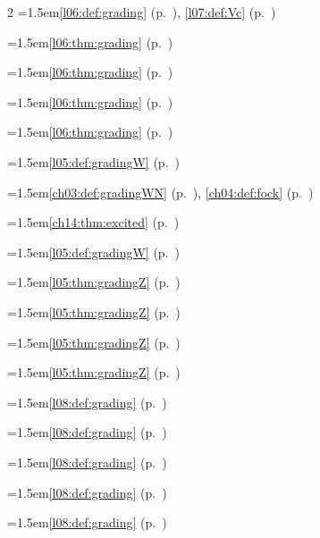 \begin{multicols}{2}
\hangindent=1.5em\quad \ref{l06:def:grading} (p.~\pageref{l06:def:grading}), \ref{l07:def:Vc} (p.~\pageref{l07:def:Vc})\par
\hangindent=1.5em\quad \ref{l06:thm:grading} (p.~\pageref{l06:thm:grading})\par
\hangindent=1.5em\quad \ref{l06:thm:grading} (p.~\pageref{l06:thm:grading})\par
\hangindent=1.5em\quad \ref{l06:thm:grading} (p.~\pageref{l06:thm:grading})\par
\hangindent=1.5em\quad \ref{l06:thm:grading} (p.~\pageref{l06:thm:grading})\par
\hangindent=1.5em\quad \ref{l05:def:gradingW} (p.~\pageref{l05:def:gradingW})\par
\hangindent=1.5em\quad \ref{ch03:def:gradingWN} (p.~\pageref{ch03:def:gradingWN}), \ref{ch04:def:fock} (p.~\pageref{ch04:def:fock})\par
\hangindent=1.5em\quad \ref{ch14:thm:excited} (p.~\pageref{ch14:thm:excited})\par
\hangindent=1.5em\quad \ref{l05:def:gradingW} (p.~\pageref{l05:def:gradingW})\par
\hangindent=1.5em\quad \ref{l05:thm:gradingZ} (p.~\pageref{l05:thm:gradingZ})\par
\hangindent=1.5em\quad \ref{l05:thm:gradingZ} (p.~\pageref{l05:thm:gradingZ})\par
\hangindent=1.5em\quad \ref{l05:thm:gradingZ} (p.~\pageref{l05:thm:gradingZ})\par
\hangindent=1.5em\quad \ref{l05:thm:gradingZ} (p.~\pageref{l05:thm:gradingZ})\par
\hangindent=1.5em\quad \ref{l08:def:grading} (p.~\pageref{l08:def:grading})\par
\hangindent=1.5em\quad \ref{l08:def:grading} (p.~\pageref{l08:def:grading})\par
\hangindent=1.5em\quad \ref{l08:def:grading} (p.~\pageref{l08:def:grading})\par
\hangindent=1.5em\quad \ref{l08:def:grading} (p.~\pageref{l08:def:grading})\par
\hangindent=1.5em\quad \ref{l08:def:grading} (p.~\pageref{l08:def:grading})\par

\end{multicols}
